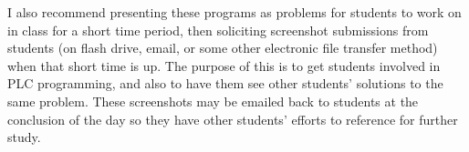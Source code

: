 \vskip 10pt

I also recommend presenting these programs as problems for students to work on in class for a short time period, then soliciting screenshot submissions from students (on flash drive, email, or some other electronic file transfer method) when that short time is up.  The purpose of this is to get students involved in PLC programming, and also to have them see other students' solutions to the same problem.  These screenshots may be emailed back to students at the conclusion of the day so they have other students' efforts to reference for further study.





